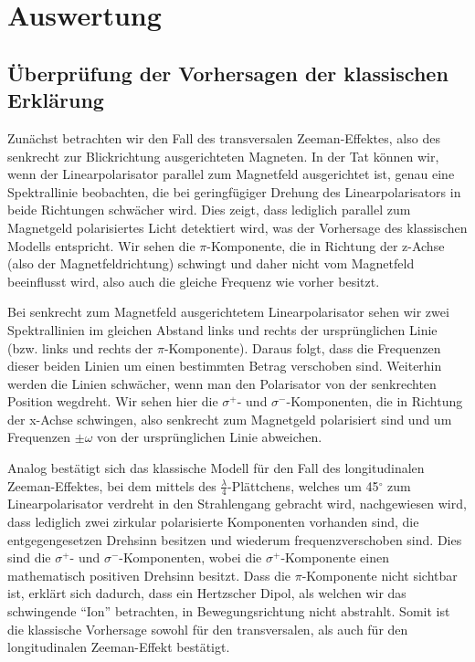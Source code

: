 \documentclass[bigchapter,colorback,accentcolor=tud4b,linedtoc,11pt]{tudreport}
\begin{document}
\chapter{Auswertung}
\section{Überprüfung der Vorhersagen der klassischen Erklärung}

Zunächst betrachten wir den Fall des transversalen Zeeman-Effektes, also des senkrecht zur Blickrichtung ausgerichteten Magneten. In der Tat können wir, wenn der Linearpolarisator parallel zum Magnetfeld ausgerichtet ist, genau eine Spektrallinie beobachten, die bei geringfügiger Drehung des Linearpolarisators in beide Richtungen schwächer wird. Dies zeigt, dass lediglich parallel zum Magnetgeld polarisiertes Licht detektiert wird, was der Vorhersage des klassischen Modells entspricht. Wir sehen die $\pi$-Komponente, die in Richtung der z-Achse (also der Magnetfeldrichtung) schwingt und daher nicht vom Magnetfeld beeinflusst wird, also auch die gleiche Frequenz wie vorher besitzt.

Bei senkrecht zum Magnetfeld ausgerichtetem Linearpolarisator sehen wir zwei Spektrallinien im gleichen Abstand links und rechts der ursprünglichen Linie (bzw. links und rechts der $\pi$-Komponente). Daraus folgt, dass die Frequenzen dieser beiden Linien um einen bestimmten Betrag verschoben sind. Weiterhin werden die Linien schwächer, wenn man den Polarisator von der senkrechten Position wegdreht. Wir sehen hier die $\sigma^+$- und $\sigma^-$-Komponenten, die in Richtung der x-Achse schwingen, also senkrecht zum Magnetgeld polarisiert sind und um Frequenzen $\pm \omega$ von der ursprünglichen Linie abweichen.

Analog bestätigt sich das klassische Modell für den Fall des longitudinalen Zeeman-Effektes, bei dem mittels des $\frac{\lambda}{4}$-Plättchens, welches um 45$^{\circ}$ zum Linearpolarisator verdreht in den Strahlengang gebracht wird, nachgewiesen wird, dass lediglich zwei zirkular polarisierte Komponenten vorhanden sind, die entgegengesetzen Drehsinn besitzen und wiederum frequenzverschoben sind. Dies sind die $\sigma^+$- und $\sigma^-$-Komponenten, wobei die $\sigma^+$-Komponente einen mathematisch positiven Drehsinn besitzt. Dass die $\pi$-Komponente nicht sichtbar ist, erklärt sich dadurch, dass ein Hertzscher Dipol, als welchen wir das schwingende "`Ion"' betrachten, in Bewegungsrichtung nicht abstrahlt. Somit ist die klassische Vorhersage sowohl für den transversalen, als auch für den longitudinalen Zeeman-Effekt bestätigt.
\end{document}
